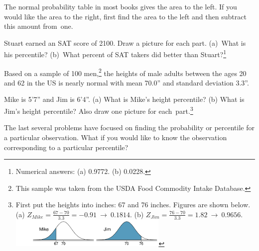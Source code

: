\begin{tipBox}{
The normal probability table in most books gives the area to the left. If you would like the area to the right, first find the area to the left and then subtract this amount from~one.}
\end{tipBox}

\begin{exercise}
Stuart earned an SAT score of 2100. Draw a picture for each part. (a)~What is his percentile? (b)~What percent of SAT takers did better than Stuart?\footnote{Numerical answers: (a) 0.9772. (b) 0.0228.}
\end{exercise}

Based on a sample of 100 men,\footnote{This sample was taken from the USDA Food Commodity Intake Database.} the heights of male adults between the ages 20 and 62 in the US is nearly normal with mean 70.0'' and standard deviation 3.3''.

\begin{exercise}
Mike is 5'7'' and Jim is 6'4''. (a) What is Mike's height percentile? (b) What is Jim's height percentile? Also draw one picture for each~part.\footnote{First put the heights into inches: 67 and 76 inches. Figures are shown below. (a) $Z_{Mike} = \frac{67 - 70}{3.3} = -0.91\ \to\ 0.1814$. (b) $Z_{Jim} = \frac{76 - 70}{3.3} = 1.82\ \to\ 0.9656$. \\\includegraphics[height=14mm]{02/figures/mikeAndJimPercentiles/mikeAndJimPercentiles}}
\end{exercise}

The last several problems have focused on finding the probability or percentile for a particular observation. What if you would like to know the observation corresponding to a particular percentile?

